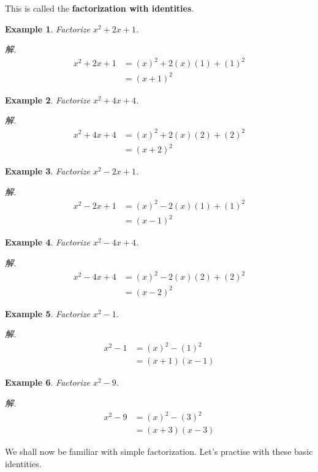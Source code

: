 \documentclass[12pt]{article}
\newtheorem{example}{Example}
\begin{document}
    This is called the \textbf{factorization with identities}.

    \begin{example}
        Factorize $x^2+2x+1$.
    \end{example}
    \textit{ 解. }\begin{align*}
        x^2+2x+1&=(x)^2+2(x)(1)+(1)^2\\
        &=(x+1)^2
    \end{align*}

    \begin{example}
        Factorize $x^2+4x+4$.
    \end{example}
    \textit{ 解. }\begin{align*}
        x^2+4x+4&=(x)^2+2(x)(2)+(2)^2\\
        &=(x+2)^2
    \end{align*}

    \begin{example}
        Factorize $x^2-2x+1$.
    \end{example}
    \textit{ 解. }\begin{align*}
        x^2-2x+1&=(x)^2-2(x)(1)+(1)^2\\
        &=(x-1)^2
    \end{align*}

    \begin{example}
        Factorize $x^2-4x+4$.
    \end{example}
    \textit{ 解. }\begin{align*}
        x^2-4x+4&=(x)^2-2(x)(2)+(2)^2\\
        &=(x-2)^2
    \end{align*}

    \begin{example}
        Factorize $x^2-1$.
    \end{example}
    \textit{ 解. }\begin{align*}
        x^2-1&=(x)^2-(1)^2\\
        &=(x+1)(x-1)
    \end{align*}

    \begin{example}
        Factorize $x^2-9$.
    \end{example}
    \textit{ 解. }\begin{align*}
        x^2-9&=(x)^2-(3)^2\\
        &=(x+3)(x-3)
    \end{align*}

    We shall now be familiar with simple factorization. Let's practise with these basic identities.
\end{document}
